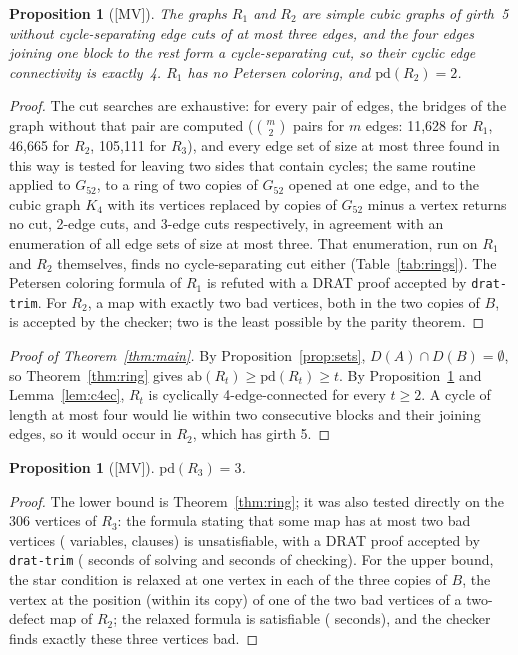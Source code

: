 \documentclass[11pt]{article}
\newtheorem{proposition}[theorem]{Proposition}
\theoremstyle{definition}
\theoremstyle{remark}
\newcommand{\pd}{\mathrm{pd}}
\newcommand{\ab}{\mathrm{ab}}
\newcommand{\Gfty}{G_{52}}
\newcommand{\claim}[1]{\textup{[#1]}}
\begin{document}
\begin{proposition}[\claim{MV}]\label{prop:rings}
The graphs $R_1$ and $R_2$ are simple cubic graphs of girth~5 without cycle-separating edge cuts of
at most three edges, and the four edges joining one block to the rest form a cycle-separating
cut, so their cyclic edge connectivity is exactly~4. $R_1$ has no Petersen coloring, and
$\pd(R_2) = 2$.
\end{proposition}

\begin{proof}
The cut searches are exhaustive: for every pair of edges, the bridges of the graph without that
pair are computed ($\binom{m}{2}$ pairs for $m$ edges: 11,628 for $R_1$, 46,665 for $R_2$, 105,111 for $R_3$), and every edge set of size at most three found in this way is tested for
leaving two sides that contain cycles; the same routine applied to $\Gfty$, to a ring of two copies
of $\Gfty$ opened at one edge, and to the cubic graph $K_4$ with its vertices replaced by copies of
$\Gfty$ minus a vertex returns no cut, 2-edge cuts, and 3-edge cuts respectively, in agreement with
an enumeration of all edge sets of size at most three. That enumeration, run on $R_1$ and $R_2$
themselves, finds no cycle-separating cut either (Table~\ref{tab:rings}). The Petersen coloring formula of
$R_1$ is refuted with a DRAT proof accepted by \texttt{drat-trim}. For $R_2$, a map with exactly two
bad vertices, both in the two copies of $B$, is accepted by the checker; two is the least possible
by the parity theorem.
\end{proof}

\begin{proof}[Proof of Theorem~\ref{thm:main}]
By Proposition~\ref{prop:sets}, $D(A) \cap D(B) = \emptyset$, so Theorem~\ref{thm:ring} gives
$\ab(R_t) \ge \pd(R_t) \ge t$. By Proposition~\ref{prop:rings} and Lemma~\ref{lem:c4ec}, $R_t$ is
cyclically 4-edge-connected for every $t \ge 2$. A cycle of length at most four would lie within
two consecutive blocks and their joining edges, so it would occur in $R_2$, which has girth 5.
\end{proof}

\begin{proposition}[\claim{MV}]\label{prop:r3}
$\pd(R_3) = 3$.
\end{proposition}

\begin{proof}
The lower bound is Theorem~\ref{thm:ring}; it was also tested directly on the 306 vertices of $R_3$:
the formula stating that some map has at most two bad vertices (\nVarsRthreeC{} variables,
\nClausesRthreeC{} clauses) is unsatisfiable, with a DRAT proof
accepted by \texttt{drat-trim} (\nRthreeSolve{} seconds of solving and \nRthreeCheck{} seconds of checking).
For the upper bound, the star condition is relaxed at one vertex in each of the three copies of
$B$, the vertex at the position (within its copy) of one of the two bad vertices of a two-defect
map of $R_2$; the relaxed formula is satisfiable (\nRthreeUpper{} seconds), and the checker finds exactly these
three vertices bad.
\end{proof}
\end{document}
